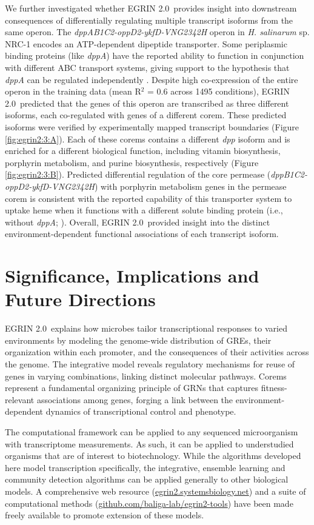 \documentclass{article}
\newcommand{\tmsamp}[1]{\textsf{#1}}
\newcommand{\halo}{{\emph{H. salinarum} sp. NRC-1 }}
\newcommand{\egrine}{{\tmsamp{EGRIN 2.0}}}
\begin{document}
We further investigated whether \egrine~provides insight into downstream consequences of differentially regulating multiple transcript isoforms from the same operon. The \textit{dppAB1C2-oppD2-ykfD-VNG2342H} operon in \halo encodes an ATP-dependent dipeptide transporter. Some periplasmic binding proteins (like \textit{dppA}) have the reported ability to function in conjunction with different ABC transport systems, giving support to the hypothesis that \textit{dppA} can be regulated independently \cite{higgins_binding_1990}. Despite high co-expression of the entire operon in the training data (mean R$^{2}$ = 0.6 across 1495 conditions), \egrine~predicted that the genes of this operon are transcribed as three different isoforms, each co-regulated with genes of a different corem. These predicted isoforms were verified by experimentally mapped transcript boundaries (Figure \ref{fig:egrin2:3:A}). Each of these corems contains a different \textit{dpp} isoform and is enriched for a different biological function, including vitamin biosynthesis, porphyrin metabolism, and purine biosynthesis, respectively (Figure \ref{fig:egrin2:3:B}). Predicted differential regulation of the core permease (\textit{dppB1C2-oppD2-ykfD-VNG2342H}) with porphyrin metabolism genes in the permease corem is consistent with the reported capability of this transporter system to uptake heme when it functions with a different solute binding protein (i.e., without \textit{dppA}; \cite{letoffe_housekeeping_2006}). Overall, \egrine~provided insight into the distinct environment-dependent functional associations of each transcript isoform.   

\section{Significance, Implications and Future Directions}

\egrine~explains how microbes tailor transcriptional responses to varied environments by modeling the genome-wide distribution of GREs, their organization within each promoter, and the consequences of their activities across the genome. The integrative model reveals regulatory mechanisms for reuse of genes in varying combinations, linking distinct molecular pathways. Corems represent a fundamental organizing principle of GRNs that captures fitness-relevant associations among genes, forging a link between the environment-dependent dynamics of transcriptional control and phenotype. 

The computational framework can be applied to any sequenced microorganism with transcriptome measurements. As such, it can be applied to understudied organisms that are of interest to biotechnology. While the algorithms developed here model transcription specifically, the integrative, ensemble learning and community detection algorithms can be applied generally to other biological models. A comprehensive web resource (\href{http://egrin2.systemsbiology.net}{egrin2.systemsbiology.net}) and a suite of computational methods (\href{http://nbviewer.ipython.org/github/baliga-lab/egrin2-tools/blob/master/doc/index.ipynb}{github.com/baliga-lab/egrin2-tools}) have been made freely available to promote extension of these models.   
\end{document}
